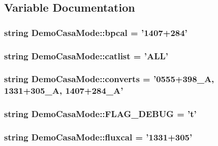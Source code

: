 \subsection{\-Variable \-Documentation}
\hypertarget{namespace_demo_casa_mode_a1a2a9791e6717f173770807553cdd7a8}{
\subsubsection[{bpcal}]{\setlength{\rightskip}{0pt plus 5cm}string {\bf \-Demo\-Casa\-Mode\-::bpcal} = '1407+284'}}\label{namespace_demo_casa_mode_a1a2a9791e6717f173770807553cdd7a8}
\hypertarget{namespace_demo_casa_mode_ae715ea4a8f2e0b845d79421b2bed9378}{
\subsubsection[{catlist}]{\setlength{\rightskip}{0pt plus 5cm}string {\bf \-Demo\-Casa\-Mode\-::catlist} = '\-A\-L\-L'}}\label{namespace_demo_casa_mode_ae715ea4a8f2e0b845d79421b2bed9378}
\hypertarget{namespace_demo_casa_mode_a8d2369517af8b0d5a4a115d27d0147c9}{
\subsubsection[{converts}]{\setlength{\rightskip}{0pt plus 5cm}string {\bf \-Demo\-Casa\-Mode\-::converts} = '0555+398\-\_\-\-A, 1331+305\-\_\-\-A, 1407+284\-\_\-\-A'}}\label{namespace_demo_casa_mode_a8d2369517af8b0d5a4a115d27d0147c9}
\hypertarget{namespace_demo_casa_mode_a89cb24c6660121b3b93b6b0b126f94c7}{
\subsubsection[{\-F\-L\-A\-G\-\_\-\-D\-E\-B\-U\-G}]{\setlength{\rightskip}{0pt plus 5cm}string {\bf \-Demo\-Casa\-Mode\-::\-F\-L\-A\-G\-\_\-\-D\-E\-B\-U\-G} = 't'}}\label{namespace_demo_casa_mode_a89cb24c6660121b3b93b6b0b126f94c7}
\hypertarget{namespace_demo_casa_mode_a614a57418c15e6ba43a8299d68c8b24f}{
\subsubsection[{fluxcal}]{\setlength{\rightskip}{0pt plus 5cm}string {\bf \-Demo\-Casa\-Mode\-::fluxcal} = '1331+305'}}\label{namespace_demo_casa_mode_a614a57418c15e6ba43a8299d68c8b24f}
